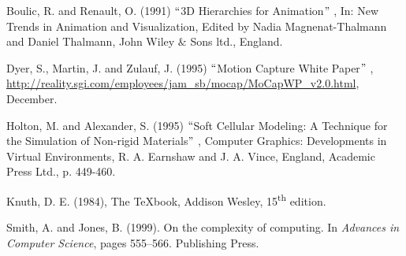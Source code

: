\documentclass[12pt]{article}
\begin{document}
\par

Boulic, R. and Renault, O. (1991) $``$3D Hierarchies for Animation$"$ , In: New Trends in Animation and Visualization, Edited by Nadia Magnenat-Thalmann and Daniel Thalmann, John Wiley $\&$  Sons ltd., England.\par

Dyer, S., Martin, J. and Zulauf, J. (1995) $``$Motion Capture White Paper$"$ , \href{http://reality.sgi.com/employees/jam\_sb/mocap/MoCapWP\_v2.0.html}{http://reality.sgi.com/employees/jam\_sb/mocap/MoCapWP\_v2.0.html}, December.\par

Holton, M. and Alexander, S. (1995) $``$Soft Cellular Modeling: A Technique for the Simulation of Non-rigid Materials$"$ , Computer Graphics: Developments in Virtual Environments, R. A. Earnshaw and J. A. Vince, England, Academic Press Ltd., p. 449-460.\par

Knuth, D. E. (1984), The TeXbook, Addison Wesley, 15\textsuperscript{th} edition. \par

Smith, A. and Jones, B. (1999). On the complexity of computing. In \textit{Advances in Computer Science}, pages 555–566. Publishing Press.\par


\vspace{\baselineskip}

\vspace{\baselineskip}
\end{document}
